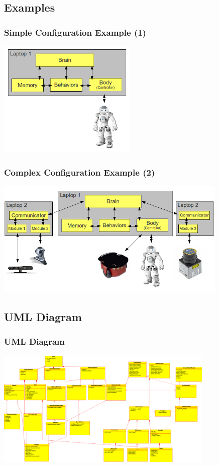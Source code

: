 \documentclass[]{beamer}
\begin{document}
\subsection{Examples}

\begin{frame}
    \frametitle{Simple Configuration Example (1)}
    \begin{center}
        \includegraphics[height=2.2in]{img/arch_example_1.png}
    \end{center}
\end{frame}

\begin{frame}
    \frametitle{Complex Configuration Example (2)}
    \begin{center}
        \includegraphics[height=2.2in]{img/arch_example_2.png}
    \end{center}
\end{frame}

\subsection{UML Diagram}
\begin{frame}
    \frametitle{UML Diagram}
    \begin{center}
        \includegraphics[height=2.2in]{img/architecture.png}
    \end{center}
\end{frame}
\end{document}
